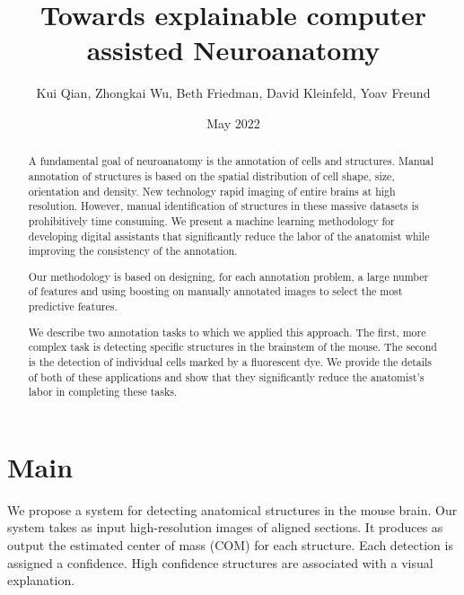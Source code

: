 \documentclass[11pt]{article}
\title{Towards explainable computer assisted Neuroanatomy}
\author{Kui Qian, Zhongkai Wu, Beth Friedman, David Kleinfeld, Yoav Freund}
\date{May 2022}
\begin{document}
\maketitle

\begin{abstract}
  A fundamental goal of neuroanatomy is the annotation of cells and
  structures.  Manual annotation of structures is based on the spatial
  distribution of cell shape, size, orientation and density.  New
  technology rapid imaging of entire brains at high resolution.
  However, manual identification of structures in these massive
  datasets is prohibitively time consuming.  We present a machine
  learning methodology for developing digital assistants that
  significantly reduce the labor of the anatomist while improving the
  consistency of the annotation.

  Our methodology is based on designing, for each annotation problem,
  a large number of features and using boosting on manually annotated
  images to select the most predictive features.

  We describe two annotation tasks to which we applied this approach.
  The first, more complex task is detecting specific structures in the
  brainstem of the mouse. The second is the detection of individual cells marked
  by a fluorescent dye. We provide the details of both of these
  applications and show that they significantly reduce the anatomist's
  labor in completing these tasks.
  
\end{abstract}

\section{Main}
We propose a system for detecting anatomical structures in the mouse
brain. Our system takes as input high-resolution images of aligned
sections. It produces as output the estimated center of mass (COM) for
each structure. Each detection is assigned a confidence. High
confidence structures are associated with a visual explanation.
\end{document}
